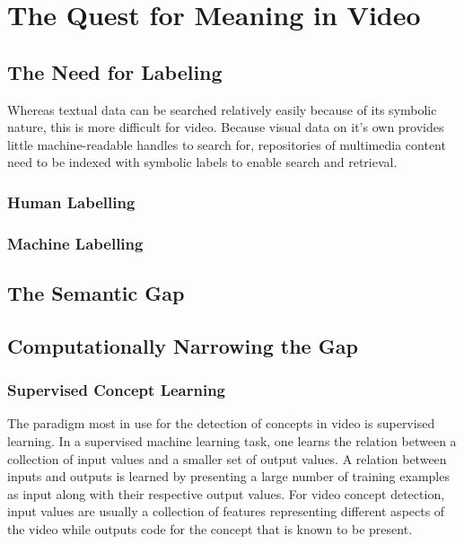 \chapter{The Quest for Meaning in Video}
\label{ch:quest}





\section{The Need for Labeling}

Whereas textual data can be searched relatively easily because of its symbolic nature, this is more difficult for video. Because visual data on it's own provides little machine-readable handles to search for, repositories of multimedia content need to be indexed with symbolic labels to enable search and retrieval. 


\subsection{Human Labelling}

\subsection{Machine Labelling}


\section{The Semantic Gap}


\section{Computationally Narrowing the Gap}

\subsection{Supervised Concept Learning}

The paradigm most in use for the detection of concepts in video is supervised learning. In a supervised machine learning task, one learns the relation between a collection of input values and a smaller set of output values. A relation between inputs and outputs is learned by presenting a large number of training examples as input along with their respective output values. For video concept detection, input values are usually a collection of features representing different aspects of the video while outputs code for the concept that is known to be present. 

